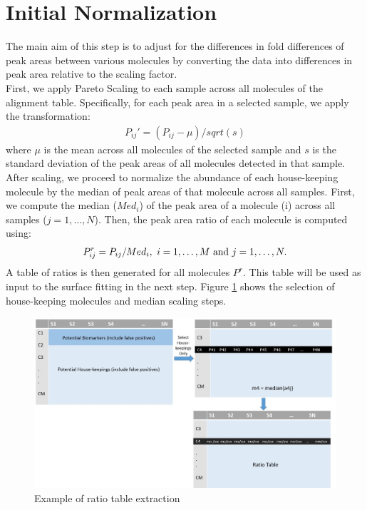 \section{Initial Normalization}
The main aim of this step is to adjust for the differences in fold differences of peak areas between various molecules by converting the data into differences in peak area relative to the scaling factor. \\
\indent First, we apply Pareto Scaling \cite{berg:tar} to each sample across all molecules of the alignment table. Specifically, for each peak area in a selected sample, we apply the transformation:
\begin{eqnarray}\label{eq:0}
P_{ij}'= (P_{ij} - \mu ) / sqrt(s) 
\end{eqnarray}
where $\mu$ is the mean across all molecules of the selected sample and $s$ is the standard deviation of the peak areas of all molecules detected in that sample.\\
\indent After scaling, we proceed to normalize the abundance of each house-keeping molecule by the median of peak areas of that molecule across all samples. First, we compute the median ($Med_i$) of the peak area of a molecule (i) across all samples ($j=1,\dots ,N$). Then, the peak area ratio of each molecule is computed using:
\begin{eqnarray}\label{eq:2}
P_{ij}^r=P_{ij} / Med_i , \text{ $ i=1, \dots ,M$ and $j= 1, \dots ,N.$}
\end{eqnarray}
A table of ratios is then generated for all molecules $P^r$. This table will be used as input to the surface fitting in the next step.  Figure \ref{first_step} shows the selection of house-keeping molecules and median scaling steps.
\begin{figure}
	
	\centering
	\includegraphics[width=1\textwidth]{first_step}
	\caption{Example of ratio table extraction}
	\label{first_step}
\end{figure}
